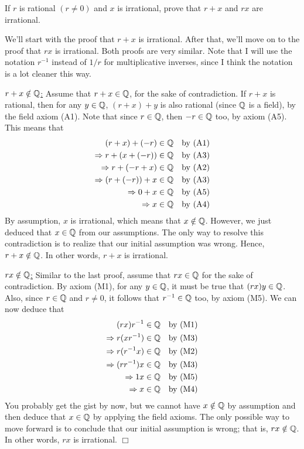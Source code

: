 If $r$ is rational $(r \neq 0)$ and $x$ is irrational, prove that $r + x$ and $rx$ are irrational.

\vspace{2mm}
\solve
We'll start with the proof that $r +x$ is irrational.
After that, we'll move on to the proof that $rx$ is irrational.
Both proofs are very similar.
Note that I will use the notation $r^{-1}$ instead of $1/r$ for multiplicative inverses, since I think the notation is a lot cleaner this way.

\vspace{2mm}
\noindent \underline{$r + x \notin \mathbb{Q}$:}
Assume that $r + x \in \mathbb{Q}$, for the sake of contradiction.
If $r + x$ is rational, then for any $y \in \mathbb{Q}$, $(r + x) + y$ is also rational (since $\mathbb{Q}$ is a field), by the field axiom (A1).
Note that since $r \in \mathbb{Q}$, then $-r \in \mathbb{Q}$ too, by axiom (A5).
This means that
\begin{align*}
    (r + x) + (-r) &\in \mathbb{Q} &\text{by (A1)} \\
    \Rightarrow r + (x + (-r)) &\in \mathbb{Q} &\text{by (A3)} \\
    \Rightarrow r + (-r + x) &\in \mathbb{Q} &\text{by (A2)} \\
    \Rightarrow (r + (-r)) + x &\in \mathbb{Q} &\text{by (A3)} \\
    \Rightarrow 0 + x &\in \mathbb{Q} &\text{by (A5)}\\
    \Rightarrow x &\in \mathbb{Q} &\text{by (A4)}
\end{align*}
By assumption, $x$ is irrational, which means that $x \notin \mathbb{Q}$.
However, we just deduced that $x \in \mathbb{Q}$ from our assumptions.
The only way to resolve this contradiction is to realize that our initial assumption was wrong.
Hence, $r + x \notin \mathbb{Q}$.
In other words, $r + x$ is irrational.

\vspace{2mm}
\noindent \underline{$rx \notin \mathbb{Q}$:}
Similar to the last proof, assume that $rx \in \mathbb{Q}$ for the sake of contradiction.
By axiom (M1), for any $y \in \mathbb{Q}$, it must be true that $(rx)y \in \mathbb{Q}$.
Also, since $r \in \mathbb{Q}$ and $r \neq 0$, it follows that $r^{-1} \in \mathbb{Q}$ too, by axiom (M5).
We can now deduce that
\begin{align*}
    (rx)r^{-1} &\in \mathbb{Q} &\text{by (M1)} \\
    \Rightarrow r (x r^{-1}) &\in \mathbb{Q} &\text{by (M3)}\\
    \Rightarrow r (r^{-1} x) &\in \mathbb{Q} &\text{by (M2)}\\
    \Rightarrow (r r^{-1}) x &\in \mathbb{Q} &\text{by (M3)}\\
    \Rightarrow 1x &\in \mathbb{Q} &\text{by (M5)}\\
    \Rightarrow x &\in \mathbb{Q} &\text{by (M4)}
\end{align*}
You probably get the gist by now, but we cannot have $x \notin \mathbb{Q}$ by assumption and then deduce that $x \in \mathbb{Q}$ by applying the field axioms.
The only possible way to move forward is to conclude that our initial assumption is wrong; 
that is, $rx \notin \mathbb{Q}$.
In other words, $rx$ is irrational.
$\Box$


